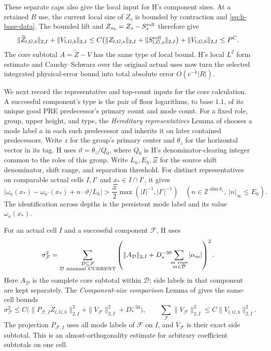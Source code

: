 These separate caps also give the local input for H's component
sizes.  At a retained \(B\) use, the current local size of \(Z_s\)
is bounded by contraction and \eqref{eq:h-base-data}.  The
bounded lift and \(Z_{u_b}=Z_s-S^{\rm roll}_s\) therefore give
\[
 \|\widetilde Z_{l,G,b}\|_{2,I}+\|V_{l,G,b}\|_{2,I}
 \le C\bigl(\|Z_{l,G,s}\|_{2,I}
             +\|S^{\rm roll}_{l,G,s}\|_{2,I}\bigr)
             +\|V_{l,G,b}\|_{2,I}
 \le P^C.
\]
The core subtotal \(A=\widetilde Z-V\) has the same type of local
bound.  H's local \(L^2\) form estimate and Cauchy--Schwarz over
the original actual uses now turn the selected integrated
physical-error bound into total absolute error \(O(e^{-k}|R|)\).

We next record the representative and top-count inputs for the
core calculation.  A successful component's type is the pair of
floor logarithms, to base \(1.1\), of its unique good PRE
predecessor's primary count and mode count.  For a fixed role,
group, upper height, and type, the
\emph{Hereditary representatives} Lemma of
\cite[Section~8]{H} chooses a mode label \(a\) in each such
predecessor and inherits it on later contained predecessors.
Write \(z\) for the group's primary center and \(\theta_z\) for
the horizontal vector in its tag.  H uses
\(\vartheta=\theta_z/Q_0\), where \(Q_0\) is H's denominator-clearing
integer common to the roles of this group.  Write \(L_h,E_h,\Xi\) for the
source shift denominator, shift range, and separation threshold.
For distinct representatives on comparable actual cells \(I,I'\)
and \(x_*\in I\cap I'\), it gives
\begin{equation}
 |\omega_a(x_*)-\omega_{a'}(x_*)+n\cdot\vartheta/L_h|
   >\frac{\Xi}{2}\max(|I|^{-1},|I'|^{-1})
 \quad(n\in\mathbb Z^{\dim\theta_z},\ |n|_\infty\le E_h).
 \label{eq:h-representative-separation}
\end{equation}
The identification across depths is the persistent mode label
and its value \(\omega_a(x_*)\).

For an actual cell \(I\) and a successful component
\(\mathcal F\), H uses
\[
 \sigma_{\mathcal F}^2
 =\sum_{\substack{\mathcal D\subseteq\mathcal F\\
                    \mathcal D\ {\rm minimal\ CURRENT}}}
    \left(\|A_{\mathcal D}\|_{2,I}
       +D_*^{-30}\!\!\sum_{\substack{m\ {\rm core}\\m\in\mathcal D}}
                         |\alpha_m|\right)^2.
\]
Here \(A_{\mathcal D}\) is the complete core subtotal within
\(\mathcal D\); side labels in that component are kept separately.
The \emph{Component-size comparison} Lemma of
\cite[Section~8]{H} gives the same-cell bounds
\[
 \sigma_{\mathcal F}^2
 \le C\bigl(\|P_{\mathcal F,I}\widetilde Z_{l,G,b}\|_{2,I}^2
             +\|V_{\mathcal F}\|_{2,I}^2+D_*^{-50}\bigr),
 \qquad
 \sum_{\mathcal F}\|V_{\mathcal F}\|_{2,I}^2
       \le C\|V_{l,G,b}\|_{2,I}^2.
\]
The projection \(P_{\mathcal F,I}\) uses all mode labels of
\(\mathcal F\) on \(I\), and \(V_{\mathcal F}\) is their exact
side subtotal.  This is an almost-orthogonality estimate for
arbitrary coefficient subtotals on one cell.

